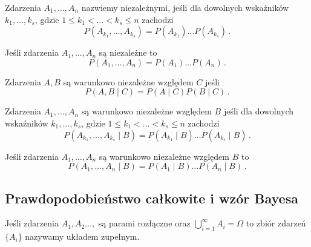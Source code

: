 \documentclass{myclass}
\numberwithin{equation}{section}
\begin{document}
\begin{definition}
Zdarzenia \(A_1,\ldots,A_n\) nazwiemy niezależnymi, jeśli dla dowolnych wskaźników
\(k_1,\ldots,k_s\), gdzie \(1 \leq k_1 < \ldots < k_s \leq n\) zachodzi
\begin{equation*}
    P(A_{k_1},\ldots,A_{k_s}) = P(A_{k_1}) \ldots P(A_{k_s})\,.
\end{equation*}
\end{definition}

\begin{theorem}
Jeśli zdarzenia \(A_1,\ldots,A_n\) są niezależne to
\begin{equation*}
    P(A_1,\ldots,A_n) = P(A_1) \ldots P(A_n)\,.
\end{equation*}
\end{theorem}

\begin{definition}
Zdarzenia \(A,B\) są warunkowo niezależne względem \(C\) jeśli
\begin{equation*}
    P(A,B \mid C) = P(A \mid C) P(B \mid C)\,.
\end{equation*}
\end{definition}

\begin{definition}
Zdarzenia \(A_1,\ldots,A_n\) są warunkowo niezależne względem \(B\) jeśli dla dowolnych wskaźników
\(k_1,\ldots,k_s\), gdzie \(1 \leq k_1 < \ldots < k_s \leq n\) zachodzi
\begin{equation*}
    P(A_{k_1},\ldots,A_{k_s} \mid B) = P(A_{k_1} \mid B) \ldots P(A_{k_s} \mid B)\,.
\end{equation*}
\end{definition}

\begin{theorem}
Jeśli zdarzenia \(A_1,\ldots,A_n\) są warunkowo niezależne względem \(B\) to
\begin{equation*}
    P(A_1,\ldots,A_n \mid B) = P(A_1 \mid B) \ldots P(A_n \mid B)\,.
\end{equation*}
\end{theorem}


\subsection{Prawdopodobieństwo całkowite i wzór Bayesa}

\begin{definition}
Jeśli zdarzenia \(A_1,A_2\ldots,\) są parami rozłączne oraz \(\bigcup_{i=1}^\infty A_i = \Omega\) to
zbiór zdarzeń \(\{A_i\}\) nazywamy układem zupełnym.
    
\end{definition}
\end{document}
